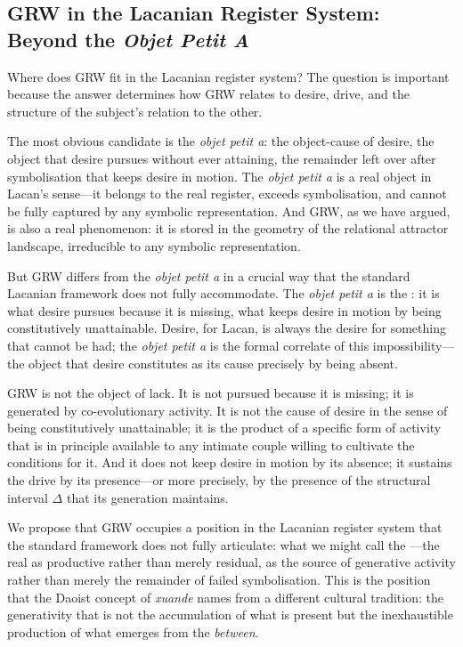 \subsection{GRW in the Lacanian Register System: Beyond the \emph{Objet Petit A}}
\label{p15:subsec:objet_a}

\noindent
Where does GRW fit in the Lacanian register system? The question is important because the answer determines how GRW relates to desire, drive, and the structure of the subject's relation to the other.

The most obvious candidate is the \emph{objet petit a}: the object-cause of desire, the object that desire pursues without ever attaining, the remainder left over after symbolisation that keeps desire in motion. The \emph{objet petit a} is a real object in Lacan's sense---it belongs to the real register, exceeds symbolisation, and cannot be fully captured by any symbolic representation. And GRW, as we have argued, is also a real phenomenon: it is stored in the geometry of the relational attractor landscape, irreducible to any symbolic representation.

But GRW differs from the \emph{objet petit a} in a crucial way that the standard Lacanian framework does not fully accommodate. The \emph{objet petit a} is the : it is what desire pursues because it is missing, what keeps desire in motion by being constitutively unattainable. Desire, for Lacan, is always the desire for something that cannot be had; the \emph{objet petit a} is the formal correlate of this impossibility---the object that desire constitutes as its cause precisely by being absent.

GRW is not the object of lack. It is not pursued because it is missing; it is generated by co-evolutionary activity. It is not the cause of desire in the sense of being constitutively unattainable; it is the product of a specific form of activity that is in principle available to any intimate couple willing to cultivate the conditions for it. And it does not keep desire in motion by its absence; it sustains the drive by its presence---or more precisely, by the presence of the structural interval $\Delta$ that its generation maintains.

We propose that GRW occupies a position in the Lacanian register system that the standard framework does not fully articulate: what we might call the ---the real as productive rather than merely residual, as the source of generative activity rather than merely the remainder of failed symbolisation. This is the position that the Daoist concept of \emph{xuande} names from a different cultural tradition: the generativity that is not the accumulation of what is present but the inexhaustible production of what emerges from the \emph{between}.

